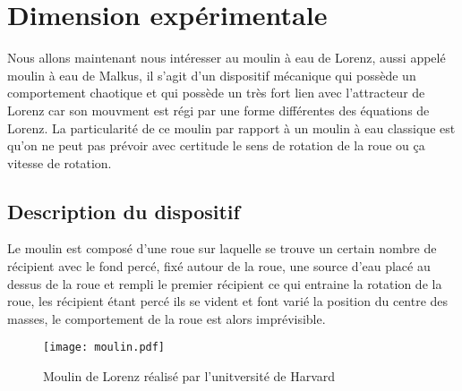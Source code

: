 \section{Dimension expérimentale}

Nous allons maintenant nous intéresser au moulin à eau de Lorenz, aussi appelé moulin à eau de Malkus, il s'agit d'un dispositif mécanique qui possède un comportement chaotique et qui possède un très fort lien avec l'attracteur de Lorenz car son mouvment est régi par une forme différentes des équations de Lorenz. La particularité de ce moulin par rapport à un moulin à eau classique est qu'on ne peut pas prévoir avec certitude le sens de rotation de la roue ou ça vitesse de rotation.

\subsection{Description du dispositif}

Le moulin est composé d'une roue sur laquelle se trouve un certain nombre de récipient avec le fond percé, fixé autour de la roue, une source d'eau placé au dessus de la roue et rempli le premier récipient ce qui entraine la rotation de la roue, les récipient étant percé ils se vident et font varié la position du centre des masses, le comportement de la roue est alors imprévisible.

\begin{figure}
    \texttt{[image: moulin.pdf]}
    \caption{Moulin de Lorenz réalisé par l'unitversité de Harvard} 
\end{figure}

